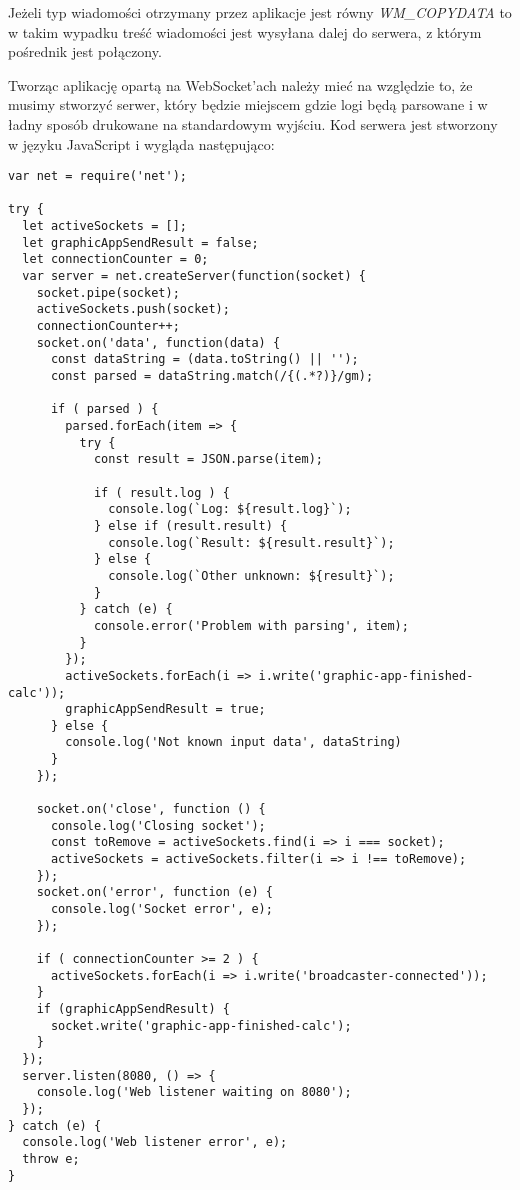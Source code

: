 Jeżeli typ wiadomości otrzymany przez aplikacje jest równy \textit{WM\_COPYDATA} to w takim wypadku treść wiadomości jest wysyłana dalej do serwera, z którym pośrednik jest połączony.
\par
Tworząc aplikację opartą na WebSocket'ach należy mieć na względzie to, że musimy stworzyć serwer, który będzie miejscem gdzie logi będą parsowane i w ładny sposób drukowane na standardowym wyjściu. Kod serwera jest stworzony w języku JavaScript i wygląda następująco:
\begin{lstlisting}[caption={Kod aplikacji serwera który wyświetla logi z aplikacji graficznej}]
var net = require('net');

try {
  let activeSockets = [];
  let graphicAppSendResult = false;
  let connectionCounter = 0;
  var server = net.createServer(function(socket) {
    socket.pipe(socket);
    activeSockets.push(socket);
    connectionCounter++;
    socket.on('data', function(data) {
      const dataString = (data.toString() || '');
      const parsed = dataString.match(/{(.*?)}/gm);

      if ( parsed ) {
        parsed.forEach(item => {
          try {
            const result = JSON.parse(item);

            if ( result.log ) {
              console.log(`Log: ${result.log}`);
            } else if (result.result) {
              console.log(`Result: ${result.result}`);
            } else {
              console.log(`Other unknown: ${result}`);
            }
          } catch (e) {
            console.error('Problem with parsing', item);
          }
        });
        activeSockets.forEach(i => i.write('graphic-app-finished-calc'));
        graphicAppSendResult = true;
      } else {
        console.log('Not known input data', dataString)
      }
    });

    socket.on('close', function () {
      console.log('Closing socket');
      const toRemove = activeSockets.find(i => i === socket);
      activeSockets = activeSockets.filter(i => i !== toRemove);
    });
    socket.on('error', function (e) {
      console.log('Socket error', e);
    });

    if ( connectionCounter >= 2 ) {
      activeSockets.forEach(i => i.write('broadcaster-connected'));
    }
    if (graphicAppSendResult) {
      socket.write('graphic-app-finished-calc');
    }
  });
  server.listen(8080, () => {
    console.log('Web listener waiting on 8080');
  });
} catch (e) {
  console.log('Web listener error', e);
  throw e;
}
\end{lstlisting}
